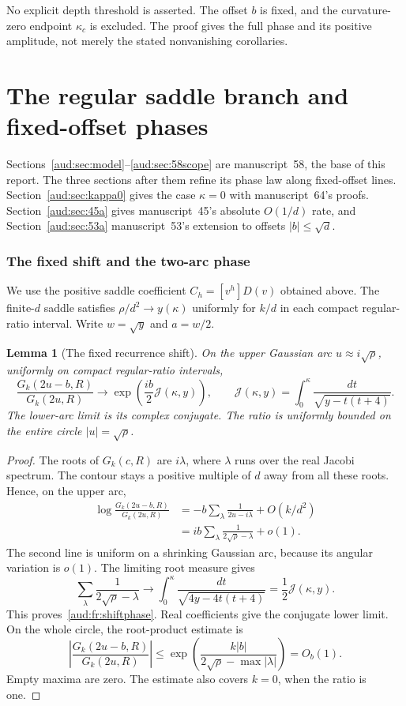 \documentclass[11pt,a4paper]{article}
\numberwithin{equation}{section}
\newtheorem{lemma}[theorem]{Lemma}
\begin{document}
No explicit depth threshold is asserted. The offset $b$ is fixed, and the curvature-zero endpoint $\kappa_c$ is excluded. The proof gives the full phase and its positive amplitude, not merely the stated nonvanishing corollaries.
\part{The regular saddle branch and fixed-offset phases}\label{aud:part:I}
Sections~\ref{aud:sec:model}--\ref{aud:sec:58scope} are manuscript~58, the base of this report. The three sections after them refine its phase law along fixed-offset lines. Section~\ref{aud:sec:kappa0} gives the case $\kappa=0$ with manuscript~64's proofs. Section~\ref{aud:sec:45a} gives manuscript~45's absolute $O(1/d)$ rate, and Section~\ref{aud:sec:53a} manuscript~53's extension to offsets $|b|\le\sqrt d$.



\section{The fixed shift and the two-arc phase}\label{aud:fr:phasesec}
We use the positive saddle coefficient $C_h=[v^h]D(v)$ obtained above. The finite-$d$ saddle satisfies $\rho/d^2\to y(\kappa)$ uniformly for $k/d$ in each compact regular-ratio interval. Write $w=\sqrt y$ and $a=w/2$.

\begin{lemma}[The fixed recurrence shift]\label{aud:fr:shiftlemma}
On the upper Gaussian arc $u\approx i\sqrt\rho$, uniformly on compact regular-ratio intervals,
\begin{equation}\label{aud:fr:shiftphase}
 \frac{G_k(2u-b,R)}{G_k(2u,R)}
 \longrightarrow \exp\left(\frac{ib}{2}\mathcal J(\kappa,y)\right),
 \qquad
 \mathcal J(\kappa,y)=\int_0^\kappa\frac{dt}{\sqrt{y-t(t+4)}}.
\end{equation}
The lower-arc limit is its complex conjugate. The ratio is uniformly bounded on the entire circle $|u|=\sqrt\rho$.
\end{lemma}
\begin{proof}
The roots of $G_k(c,R)$ are $i\lambda$, where $\lambda$ runs over the real Jacobi spectrum. The contour stays a positive multiple of $d$ away from all these roots. Hence, on the upper arc,
\begin{align*}
 \log\frac{G_k(2u-b,R)}{G_k(2u,R)}
 &=-b\sum_\lambda\frac1{2u-i\lambda}+O(k/d^2)\\
 &=ib\sum_\lambda\frac1{2\sqrt\rho-\lambda}+o(1).
\end{align*}
The second line is uniform on a shrinking Gaussian arc, because its angular variation is $o(1)$. The limiting root measure gives
\[
 \sum_\lambda\frac1{2\sqrt\rho-\lambda}
 \longrightarrow
 \int_0^\kappa\frac{dt}{\sqrt{4y-4t(t+4)}}
 =\frac12\mathcal J(\kappa,y).
\]
This proves~\eqref{aud:fr:shiftphase}. Real coefficients give the conjugate lower limit. On the whole circle, the root-product estimate is
\[
 \left|\frac{G_k(2u-b,R)}{G_k(2u,R)}\right|
 \le\exp\left(\frac{k|b|}{2\sqrt\rho-\max|\lambda|}\right)=O_b(1).
\]
Empty maxima are zero. The estimate also covers $k=0$, when the ratio is one.
\end{proof}
\end{document}

